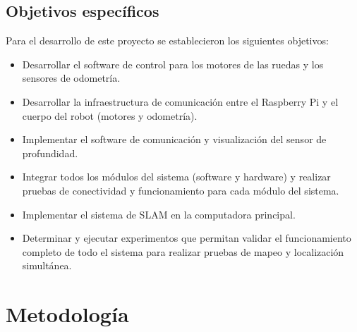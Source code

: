 \subsection{Objetivos específicos}
Para el desarrollo de este proyecto se establecieron los siguientes objetivos:

\begin{itemize} %
	\item Desarrollar el software de control para los motores de las ruedas y los sensores de odometría.
	\item Desarrollar la infraestructura de comunicación entre el Raspberry Pi y el cuerpo del robot (motores y odometría). \item Implementar el software de comunicación y visualización del sensor de profundidad.
	\item Integrar todos los módulos del sistema (software y hardware) y realizar pruebas de conectividad y funcionamiento para cada módulo del sistema.
	\item Implementar el sistema de SLAM en la computadora principal.
	\item Determinar y ejecutar experimentos que permitan validar el funcionamiento completo de todo el sistema para realizar pruebas de mapeo y localización simultánea.
\end{itemize}

\section{Metodología}

